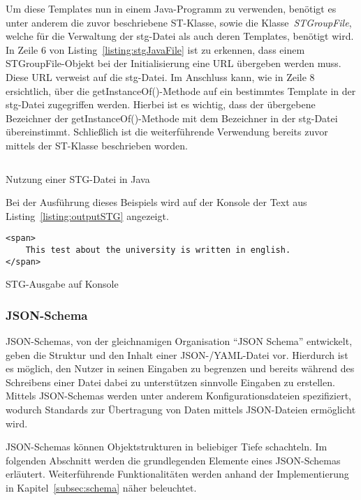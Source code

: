 Um diese Templates nun in einem Java-Programm zu verwenden, benötigt es unter anderem die zuvor beschriebene ST-Klasse, sowie
die Klasse~\textit{STGroupFile}, welche für die Verwaltung der stg-Datei als auch deren Templates, benötigt wird.
In Zeile 6 von Listing~\ref{listing:stgJavaFile} ist zu erkennen, dass einem STGroupFile-Objekt bei der Initialisierung eine URL übergeben werden muss.
Diese URL verweist auf die stg-Datei.
Im Anschluss kann, wie in Zeile 8 ersichtlich, über die getInstanceOf()-Methode auf ein bestimmtes Template in der stg-Datei zugegriffen werden.
Hierbei ist es wichtig, dass der übergebene Bezeichner der getInstanceOf()-Methode mit dem Bezeichner in der stg-Datei übereinstimmt.
Schließlich ist die weiterführende Verwendung bereits zuvor mittels der ST-Klasse beschrieben worden.

\begin{listing}[!ht]
    \inputminted{java}{listings/2.2.1/JavaSTGExample.java}
    \caption{Nutzung einer STG-Datei in Java}
    \label{listing:stgJavaFile}
\end{listing}

Bei der Ausführung dieses Beispiels wird auf der Konsole der Text aus Listing~\ref{listing:outputSTG} angezeigt.

\begin{listing}[!ht]
    \begin{verbatim}
<span>
    This test about the university is written in english.
</span>
    \end{verbatim}
    \caption{STG-Ausgabe auf Konsole}
    \label{listing:outputSTG}
\end{listing}

\subsubsection{JSON-Schema}\label{subsubsec:json-schema}
JSON-Schemas, von der gleichnamigen Organisation ``JSON Schema'' entwickelt, geben die Struktur und den Inhalt einer JSON-/YAML-Datei vor\cite*{jsonSchema}.
Hierdurch ist es möglich, den Nutzer in seinen Eingaben zu begrenzen und bereits während des Schreibens einer Datei dabei zu unterstützen sinnvolle Eingaben zu erstellen.
Mittels JSON-Schemas werden unter anderem Konfigurationsdateien spezifiziert, wodurch Standards zur Übertragung von Daten mittels JSON-Dateien ermöglicht wird.

JSON-Schemas können Objektstrukturen in beliebiger Tiefe schachteln.
Im folgenden Abschnitt werden die grundlegenden Elemente eines JSON-Schemas erläutert.
Weiterführende Funktionalitäten werden anhand der Implementierung in Kapitel~\ref{subsec:schema} näher beleuchtet.

